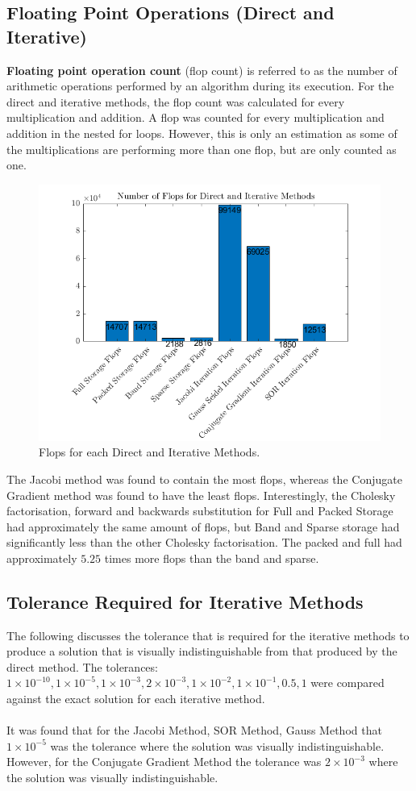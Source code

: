 \documentclass[12pt,a4paper]{article}
\begin{document}
\subsection{Floating Point Operations (Direct and Iterative)}
\textbf{Floating point operation count} (flop count) is referred to as the number of arithmetic operations performed by an algorithm during its execution. For the direct and iterative methods, the flop count was calculated for every multiplication and addition. A flop was counted for every multiplication and addition in the nested for loops. However, this is only an estimation as some of the multiplications are performing more than one flop, but are only counted as one.
\begin{figure}[H]
	\includegraphics[width=\linewidth]{images/FlopsGraph.png}
	\caption{Flops for each Direct and Iterative Methods.}
	\label{fig:flops}
\end{figure}
The Jacobi method was found to contain the most flops, whereas the Conjugate Gradient method was found to have the least flops. Interestingly, the Cholesky factorisation, forward and backwards substitution for Full and Packed Storage had approximately the same amount of flops, but Band and Sparse storage had significantly less than the other Cholesky factorisation. The packed and full had approximately $5.25$ times more flops than the band and sparse.

\subsection{Tolerance Required for Iterative Methods}
The following discusses the tolerance that is required for the iterative methods to produce a solution that is visually indistinguishable from that produced by the direct method. The tolerances: $1\times10^{-10}, 1\times10^{-5}, 1\times10^{-3}, 2\times10^{-3}, 1\times10^{-2}, 1\times10^{-1}, 0.5, 1$ were compared against the exact solution for each iterative method.
\\\\
It was found that for the Jacobi Method, SOR Method, Gauss Method that $1\times10^{-5}$ was the tolerance where the solution was visually indistinguishable. However, for the Conjugate Gradient Method the tolerance was $2\times10^{-3}$ where the solution was visually indistinguishable.
\end{document}
